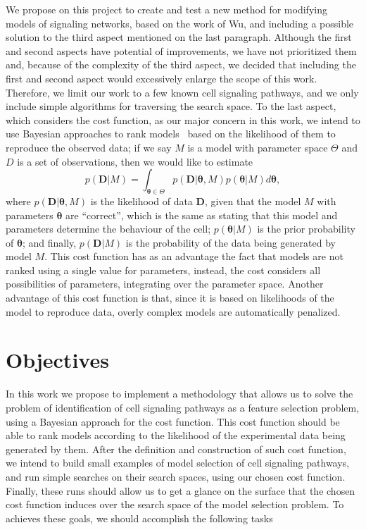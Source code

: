 We propose on this project to create and test a new method for modifying 
models of signaling networks, based on the work of Wu, and including 
a possible solution to the third aspect mentioned on the last 
paragraph. Although the first and second aspects have potential of 
improvements, we have not prioritized them and, because of the 
complexity of the third aspect, we decided that including the first and 
second aspect would excessively enlarge the scope of this work.
Therefore, we limit our work to a few known cell signaling pathways, and
we only include simple algorithms for traversing the search space. To
the last aspect, which considers the cost function, as our major 
concern in this work, we intend to use Bayesian approaches to rank 
models~\cite{Vyshemirsky2007} based on the likelihood of them to 
reproduce the observed data; if we say $M$ is a model with parameter 
space $\Theta$ and $D$ is a set of observations, then we would like to 
estimate 
\begin{equation*}
    p ({\bm D}|M) = \int_{{\bm \theta} \in \Theta} p ({\bm D} | {\bm
    \theta}, M)p({\bm \theta} | M)d{\bm \theta}, 
\end{equation*}
where $p ({\bm D}|{\bm \theta}, M)$ is the likelihood of data ${\bm D}$,
given that the model $M$ with parameters ${\bm \theta}$ are ``correct'',
which is the same as stating that this model and parameters determine
the behaviour of the cell; $p({\bm \theta} | M)$ is the prior
probability of ${\bm \theta}$; and finally, $p ({\bm D} | M)$ is the
probability of the data being generated by model $M$. This cost function
has as an advantage the fact that models are not ranked using a single
value for parameters, instead, the cost considers all possibilities of
parameters, integrating over the parameter space. Another advantage of
this cost function is that, since it is based on likelihoods of the
model to reproduce data, overly complex models are automatically
penalized.

\section{Objectives}
In this work we propose to implement a methodology that allows us 
to solve the problem of identification of cell signaling pathways as a 
feature selection problem, using a Bayesian approach for the cost
function. This cost function should be able to rank models according to
the likelihood of the experimental data being generated by them. After
the definition and construction of such cost function, we intend to
build small examples of model selection of cell signaling pathways, and
run simple searches on their search spaces, using our chosen cost 
function. Finally, these runs should allow us to get a glance on the
surface that the chosen cost function induces over the search space of
the model selection problem. To achieves these goals, we should
accomplish the following tasks

